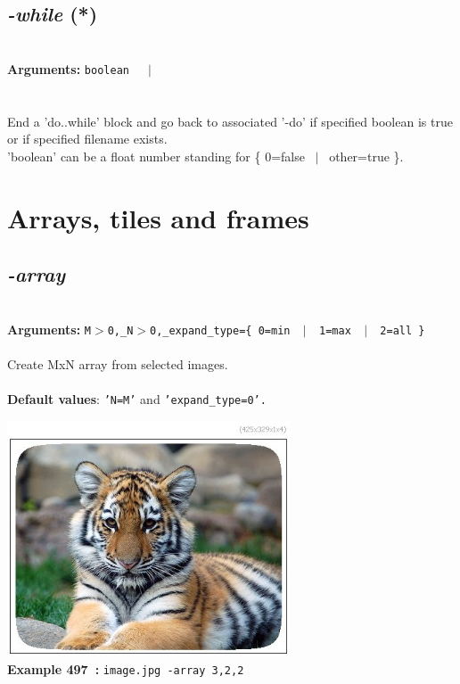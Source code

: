 \documentclass[a4paper,11pt,twoside]{book}
\begin{document}
\subsection{\emph{-while} (*)}\vspace*{-0.5em}
~\\\textbf{Arguments: } 
{\small \texttt{boolean}}~~~$|$\\
\\~\\
End a 'do..while' block and go back to associated '-do'
if specified boolean is true or if specified filename exists.
~\\'boolean' can be a float number standing for \{ 0=false ~$|$~ other=true \}.

\section{Arrays, tiles and frames}


\subsection{\emph{-array} }\vspace*{-0.5em}
~\\\textbf{Arguments: } 
{\small \texttt{M$>$0,\_N$>$0,\_expand\_type=\{ 0=min ~$|$~ 1=max ~$|$~ 2=all \}}}\\~\\
Create MxN array from selected images.
~\\~\\\textbf{Default values}: {\small \texttt{'N=M'} and \texttt{'expand\_type=0'.}}
\begin{center}\includegraphics[keepaspectratio=true,height=7cm,width=\textwidth]{img/gmic_def497.jpg}\\
{\footnotesize \textbf{Example 497~:} \texttt{image.jpg -array 3,2,2}}
\end{center}
\end{document}
